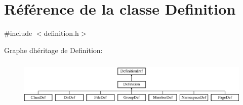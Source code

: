 \hypertarget{class_definition}{}\section{Référence de la classe Definition}
\label{class_definition}


{\ttfamily \#include $<$definition.\+h$>$}

Graphe d\textquotesingle{}héritage de Definition\+:\begin{figure}[H]
\begin{center}
\leavevmode
\includegraphics[height=2.264151cm]{class_definition}
\end{center}
\end{figure}

